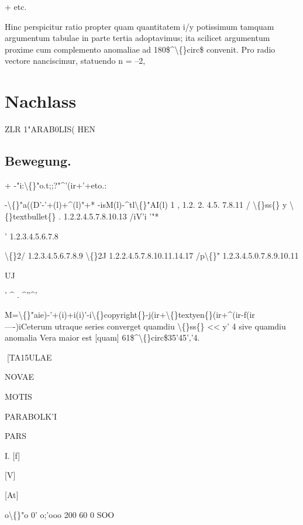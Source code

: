 \documentclass[10pt,a4paper]{article}
\begin{document}
+ etc.

Hinc perspicitur ratio propter quam quantitatem i/y potissimum tamquam argumentum tabulae in parte tertia adoptavimus; ita scilicet argumentum
proxime cum complemento anomaliae ad 180\$\textasciicircum{}\textbackslash\{\}circ\$ convenit.
Pro radio vectore nanciscimur, statuendo n = --2,

\newpage

\section*{Nachlass}

ZLR 1"ARAB0LIS( HEN

\subsection*{Bewegung.}

+ -"i:\textbackslash\{\}"o.t;;?"\textasciicircum{}'(ir+'+eto.:

-\textbackslash\{\}"a((D'-'+(l)+\textasciicircum{}(l)"+*
-isM(l)-\textasciicircum{}tl\textbackslash\{\}"AI(l)
1
, 1.2. 2. 4.5. 7.8.11 / \textbackslash\{\}ss\{\} y \textbackslash\{\}textbullet\{\} . 1.2.2.4.5.7.8.10.13 /iV'i
'"*

' 1.2.3.4.5.6.7.8

\textbackslash\{\}2/ 1.2.3.4.5.6.7.8.9
\textbackslash\{\}2J
1.2.2.4.5.7.8.10.11.14.17 /p\textbackslash\{\}"
1.2.3.4.5.0.7.8.9.10.11

UJ

' \textasciicircum{}
.
\textasciicircum{}''\textasciicircum{}'

M=\textbackslash\{\}"aie)-'+(i)+i(i)'-i\textbackslash\{\}copyright\{\}-j(ir+\textbackslash\{\}textyen\{\}(ir+\textasciicircum{}(ir-f(ir----)iCeterum utraque series converget quamdiu \textbackslash\{\}ss\{\} << y' 4 sive quamdiu anomalia
Vera maior est [quam] 61\$\textasciicircum{}\textbackslash\{\}circ\$35'45','4.

\newpage
[TA15ULAE

NOVAE

MOTIS

PARABOLK'I

PARS


I.
[f]

[V]

[At]

o\textbackslash\{\}"o 0' o;'ooo
200
60 0
SOO
\end{document}

